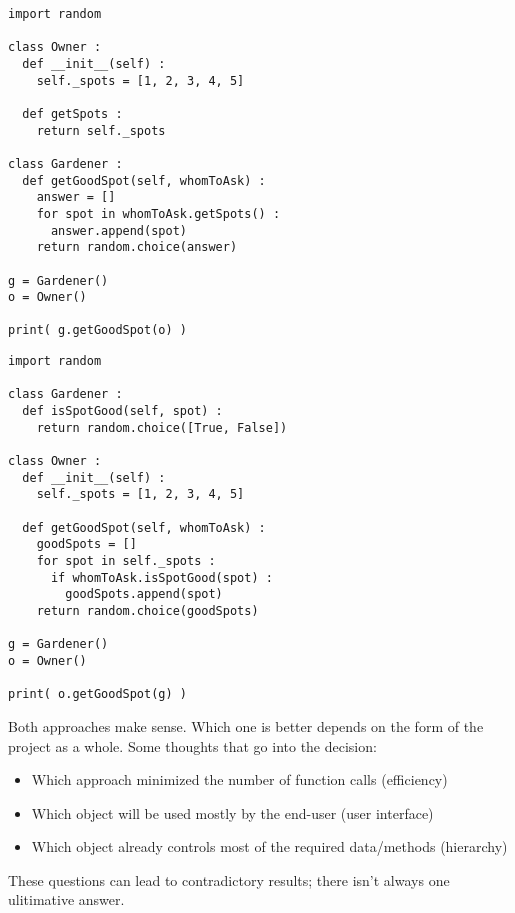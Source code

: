 \begin{frame}[fragile]
%
\begin{tcbraster}[raster columns=2,
                  raster equal height,
                  nobeforeafter,
                  raster column skip=0.5cm]
\begin{codebox}
\begin{verbatim}
import random

class Owner :
  def __init__(self) :
    self._spots = [1, 2, 3, 4, 5]
  
  def getSpots :
    return self._spots

class Gardener :
  def getGoodSpot(self, whomToAsk) :
    answer = []
    for spot in whomToAsk.getSpots() :
      answer.append(spot)
    return random.choice(answer)

g = Gardener()
o = Owner()

print( g.getGoodSpot(o) )
\end{verbatim}
\end{codebox}
%
\begin{codebox}
\begin{verbatim}
import random

class Gardener :
  def isSpotGood(self, spot) :
    return random.choice([True, False])

class Owner :
  def __init__(self) :
    self._spots = [1, 2, 3, 4, 5]
  
  def getGoodSpot(self, whomToAsk) :
    goodSpots = []
    for spot in self._spots :
      if whomToAsk.isSpotGood(spot) :
        goodSpots.append(spot)
    return random.choice(goodSpots)
    
g = Gardener()
o = Owner()

print( o.getGoodSpot(g) )
\end{verbatim}
\end{codebox}
\end{tcbraster}
%
\end{frame}


\begin{frame}
%
\begin{hintbox}
Both approaches make sense. Which one is better depends on the form of the project as a whole. Some thoughts that go into the decision:
\begin{itemize}
\item Which approach minimized the number of function calls (\thus efficiency)
\item Which object will be used mostly by the end-user (\thus user interface)
\item Which object already controls most of the required data/methods (\thus hierarchy)
\end{itemize}

These questions can lead to contradictory results; there isn't always one ulitimative answer.
\end{hintbox}
%
\end{frame}

